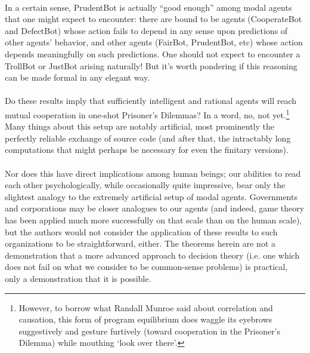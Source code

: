 \documentclass[12pt, letterpaper]{article}
\numberwithin{equation}{section}
\begin{document}
\\
In a certain sense, PrudentBot is actually ``good enough'' among modal agents that one might expect to encounter: there are bound to be agents (CooperateBot and DefectBot) whose action fails to depend in any sense upon predictions of other agents' behavior, and other agents (FairBot, PrudentBot, etc) whose action depends meaningfully on such predictions. One should not expect to encounter a TrollBot or JustBot arising naturally! But it's worth pondering if this reasoning can be made formal in any elegant way.\\
\\
Do these results imply that sufficiently intelligent and rational agents will reach mutual cooperation in one-shot Prisoner's Dilemmas? In a word, no, not yet.\footnote{However, to borrow what Randall Munroe said about correlation and causation, this form of program equilibrium does waggle its eyebrows suggestively and gesture furtively (toward cooperation in the Prisoner's Dilemma) while mouthing `look over there'.} Many things about this setup are notably artificial, most prominently the perfectly reliable exchange of source code (and after that, the intractably long computations that might perhaps be necessary for even the finitary versions).\\
\\Nor does this have direct implications among human beings; our abilities to read each other psychologically, while occasionally quite impressive, bear only the slightest analogy to the extremely artificial setup of modal agents. Governments and corporations may be closer analogues to our agents (and indeed, game theory has been applied much more successfully on that scale than on the human scale), but the authors would not consider the application of these results to such organizations to be straightforward, either. The theorems herein are not a demonstration that a more advanced approach to decision theory (i.e. one which does not fail on what we consider to be common-sense problems) is practical, only a demonstration that it is possible.
\end{document}
